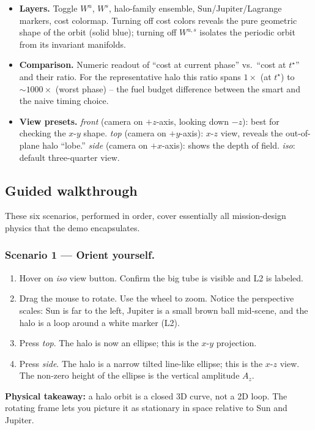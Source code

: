 \documentclass[11pt,a4paper]{article}
\begin{document}
\begin{itemize}[leftmargin=*]
  \item \textbf{Layers.}
    Toggle $W^u$, $W^s$, halo-family ensemble, Sun/Jupiter/Lagrange markers, cost colormap. Turning off cost colors reveals the pure geometric shape of the orbit (solid blue); turning off $W^{u,s}$ isolates the periodic orbit from its invariant manifolds.

  \item \textbf{Comparison.}
    Numeric readout of ``cost at current phase'' vs.\ ``cost at $t^\star$'' and their ratio. For the representative halo this ratio spans $1\times$ (at $t^\star$) to $\sim 1000\times$ (worst phase) -- the fuel budget difference between the smart and the naive timing choice.

  \item \textbf{View presets.}
    \emph{front} (camera on $+z$-axis, looking down $-z$): best for checking the $x$-$y$ shape. \emph{top} (camera on $+y$-axis): $x$-$z$ view, reveals the out-of-plane halo ``lobe.'' \emph{side} (camera on $+x$-axis): shows the depth of field. \emph{iso}: default three-quarter view.
\end{itemize}

\subsection{Guided walkthrough}\label{sec:demo:walk}

These six scenarios, performed in order, cover essentially all mission-design physics that the demo encapsulates.

\subsubsection*{Scenario 1 --- Orient yourself.}
\begin{enumerate}[leftmargin=*]
  \item Hover on \emph{iso} view button. Confirm the big tube is visible and L2 is labeled.
  \item Drag the mouse to rotate. Use the wheel to zoom. Notice the perspective scales: Sun is far to the left, Jupiter is a small brown ball mid-scene, and the halo is a loop around a white marker (L2).
  \item Press \emph{top}. The halo is now an ellipse; this is the $x$-$y$ projection.
  \item Press \emph{side}. The halo is a narrow tilted line-like ellipse; this is the $x$-$z$ view. The non-zero height of the ellipse is the vertical amplitude $A_z$.
\end{enumerate}
\textbf{Physical takeaway:} a halo orbit is a closed 3D curve, not a 2D loop. The rotating frame lets you picture it as stationary in space relative to Sun and Jupiter.
\end{document}
